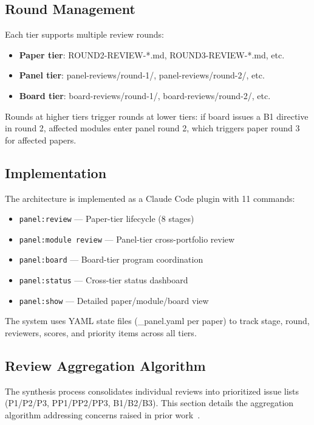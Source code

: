 \subsection{Round Management}

Each tier supports multiple review rounds:
\begin{itemize}
\item \textbf{Paper tier}: ROUND2-REVIEW-*.md, ROUND3-REVIEW-*.md, etc.
\item \textbf{Panel tier}: panel-reviews/round-1/, panel-reviews/round-2/, etc.
\item \textbf{Board tier}: board-reviews/round-1/, board-reviews/round-2/, etc.
\end{itemize}

Rounds at higher tiers trigger rounds at lower tiers: if board issues a B1 directive in round 2, affected modules enter panel round 2, which triggers paper round 3 for affected papers.

\subsection{Implementation}

The architecture is implemented as a Claude Code plugin with 11 commands:
\begin{itemize}
\item \texttt{panel:review} — Paper-tier lifecycle (8 stages)
\item \texttt{panel:module review} — Panel-tier cross-portfolio review
\item \texttt{panel:board} — Board-tier program coordination
\item \texttt{panel:status} — Cross-tier status dashboard
\item \texttt{panel:show} — Detailed paper/module/board view
\end{itemize}

The system uses YAML state files (\_panel.yaml per paper) to track stage, round, reviewers, scores, and priority items across all tiers.

\subsection{Review Aggregation Algorithm}
\label{sec:aggregation}

The synthesis process consolidates individual reviews into prioritized issue lists (P1/P2/P3, PP1/PP2/PP3, B1/B2/B3). This section details the aggregation algorithm addressing concerns raised in prior work~\cite{bernstein2015crowdsourcing,kamar2016complementarity}.


